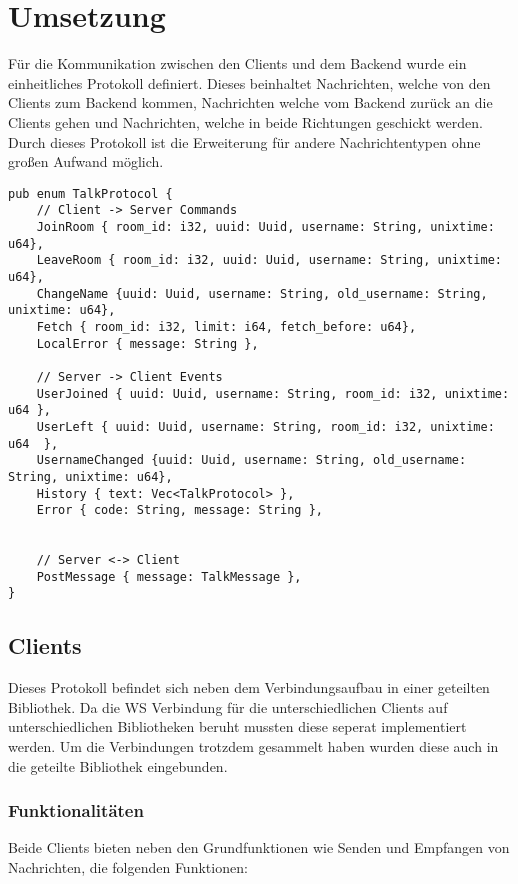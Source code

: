 
\chapter{Umsetzung}
Für die Kommunikation zwischen den Clients und dem Backend wurde ein einheitliches Protokoll definiert. Dieses beinhaltet Nachrichten, welche von den Clients zum Backend kommen, Nachrichten welche vom Backend zurück an die Clients gehen und Nachrichten, welche in beide Richtungen geschickt werden. Durch dieses Protokoll ist die Erweiterung für andere Nachrichtentypen ohne großen Aufwand möglich.

\begin{lstlisting}[caption=Kommunikationsprotokoll, label=Kommunikationsprotokoll, basicstyle=\ttfamily\scriptsize]
pub enum TalkProtocol {
    // Client -> Server Commands
    JoinRoom { room_id: i32, uuid: Uuid, username: String, unixtime: u64},
    LeaveRoom { room_id: i32, uuid: Uuid, username: String, unixtime: u64},
    ChangeName {uuid: Uuid, username: String, old_username: String, unixtime: u64},
    Fetch { room_id: i32, limit: i64, fetch_before: u64},
    LocalError { message: String },

    // Server -> Client Events
    UserJoined { uuid: Uuid, username: String, room_id: i32, unixtime: u64 },
    UserLeft { uuid: Uuid, username: String, room_id: i32, unixtime: u64  },
    UsernameChanged {uuid: Uuid, username: String, old_username: String, unixtime: u64},
    History { text: Vec<TalkProtocol> },
    Error { code: String, message: String },


    // Server <-> Client
    PostMessage { message: TalkMessage },
}
\end{lstlisting}

\section{Clients}
Dieses Protokoll befindet sich neben dem Verbindungsaufbau in einer geteilten Bibliothek. Da die \ac{WS} Verbindung für die unterschiedlichen Clients auf unterschiedlichen Bibliotheken beruht mussten diese seperat implementiert werden. Um die Verbindungen trotzdem gesammelt haben wurden diese auch in die geteilte Bibliothek eingebunden.

\subsection{Funktionalitäten}
Beide Clients bieten neben den Grundfunktionen wie Senden und Empfangen von Nachrichten, die folgenden Funktionen:


